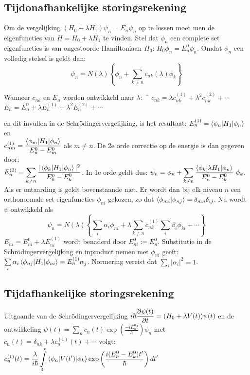 \documentclass[twoside]{report}
\begin{document}
\subsection[~~Tijdonafhankelijke storingsrekening]{Tijdonafhankelijke storingsrekening}
Om de vergelijking $(H_0+\lambda H_1)\psi_n=E_n\psi_n$ op te lossen moet men
de eigenfuncties van $H=H_0+\lambda H_1$ te vinden. Stel dat $\phi_n$ een
complete set eigenfuncties is van ongestoorde Hamiltoniaan $H_0$:
$H_0\phi_n=E_n^0\phi_n$. Omdat $\phi_n$ een volledig stelsel is geldt dan:
\[
\psi_n=N(\lambda)\left\{\phi_n+\sum_{k\neq n}c_{nk}(\lambda)\phi_k\right\}
\]
\begin{tabbing}
Wanneer $c_{nk}$ en $E_n$ worden ontwikkeld naar $\lambda$:~~\=
$c_{nk}=\lambda c_{nk}^{(1)}+\lambda^2 c_{nk}^{(2)}+\cdots$\\
\>$E_n=E_n^0+\lambda E_n^{(1)}+\lambda^2 E_n^{(2)}+\cdots$
\end{tabbing}
en dit invullen in de Schr\"odingervergelijking, is het resultaat:
$E_n^{(1)}=\left\langle \phi_n|H_1|\phi_n \right\rangle$ en\\
$\displaystyle c_{nm}^{(1)}=\frac{\left\langle \phi_m|H_1|\phi_n \right\rangle}{E_n^0-E_m^0}$
als $m\neq n$. De 2e orde correctie op de energie is dan gegeven door:\\
$\displaystyle E^{(2)}_n=\sum_{k\neq n}\frac{|\left\langle \phi_k|H_1|\phi_n \right\rangle|^2}{E^0_n-E^0_k}$.
In 1e orde geldt dus: $\displaystyle\psi_n=\phi_n+\sum_{k\neq n}
\frac{\left\langle \phi_k|\lambda H_1|\phi_n \right\rangle}{E_n^0-E_k^0}~\phi_k$.
\npar
Als er ontaarding is geldt bovenstaande niet. Er wordt dan bij elk niveau $n$
een orthonormale set eigenfuncties $\phi_{ni}$ gekozen, zo dat
$\left\langle \phi_{mi}|\phi_{nj} \right\rangle=\delta_{mn}\delta_{ij}$. Nu wordt $\psi$ ontwikkeld
als
\[
\psi_n=N(\lambda)\left\{\sum_i\alpha_i\phi_{ni}+\lambda\sum_{k\neq n}
c_{nk}^{(1)}\sum_i\beta_i\phi_{ki}+\cdots\right\}
\]
$E_{ni}=E_{ni}^0+\lambda E_{ni}^{(1)}$ wordt benaderd door $E_{ni}^0:=E_n^0$.
Substitutie in de Schr\"odingervergelijking en inproduct nemen met $\phi_{ni}$
geeft: $\sum\limits_i\alpha_i\left\langle \phi_{nj}|H_1|\phi_{ni} \right\rangle=E_n^{(1)}\alpha_j$.
Normering vereist dat $\sum\limits_i|\alpha_i|^2=1$.

\subsection[~~Tijdafhankelijke storingsrekening]{Tijdafhankelijke storingsrekening}
Uitgaande van de Schr\"odingervergelijking
$\displaystyle i\hbar\frac{\partial \psi(t)}{\partial t}=(H_0+\lambda V(t))\psi(t)$
\npar
en de ontwikkeling
$\displaystyle\psi(t)=\sum_nc_n(t)\exp\left(\frac{-iE_n^0t}{\hbar}\right)\phi_n$
met $c_n(t)=\delta_{nk}+\lambda c_n^{(1)}(t)+\cdots$
\npar
volgt: $\displaystyle
c_n^{(1)}(t)=\frac{\lambda}{i\hbar}\int\limits_0^t\left\langle \phi_n|V(t')|\phi_k \right\rangle
\exp\left(\frac{i(E_n^0-E_k^0)t'}{\hbar}\right)dt'$
\end{document}
